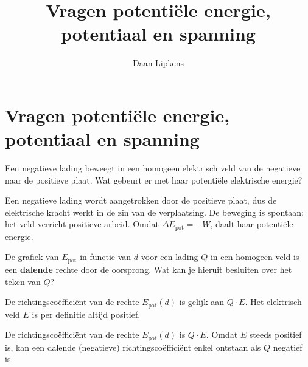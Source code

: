 \documentclass{ximera}
\title{Vragen potentiële energie, potentiaal en spanning}
\author{Daan Lipkens}
\begin{document}
\begin{abstract}
\end{abstract}
\maketitle
\label{vragen:potentiaal}
\section{Vragen potentiële energie, potentiaal en spanning}

\begin{question}
    Een negatieve lading beweegt in een homogeen elektrisch veld van de negatieve naar de positieve plaat. Wat gebeurt er met haar potentiële elektrische energie?

    \begin{multipleChoice}
    \end{multipleChoice}

    \begin{solution}\nl
        Een negatieve lading wordt aangetrokken door de positieve plaat, dus de elektrische kracht werkt in de zin van de verplaatsing. De beweging is spontaan: het veld verricht positieve arbeid. Omdat $\Delta E_{\text{pot}} = -W$, daalt haar potentiële energie.
    \end{solution}
\end{question}

\begin{question}
    De grafiek van $E_{\text{pot}}$ in functie van $d$ voor een lading $Q$ in een homogeen veld is een \textbf{dalende} rechte door de oorsprong. Wat kan je hieruit besluiten over het teken van $Q$?

    \begin{multipleChoice}
    \end{multipleChoice}

    \begin{hint}
        De richtingscoëfficiënt van de rechte $E_{\text{pot}}(d)$ is gelijk aan $Q \cdot E$. Het elektrisch veld $E$ is per definitie altijd positief.
    \end{hint}

    \begin{solution}\nl
        De richtingscoëfficiënt van de rechte $E_{\text{pot}}(d)$ is $Q \cdot E$. Omdat $E$ steeds positief is, kan een dalende (negatieve) richtingscoëfficiënt enkel ontstaan als $Q$ negatief is.
    \end{solution}
\end{question}
\end{document}
